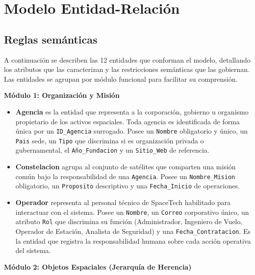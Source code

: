 \chapter{Modelo Entidad-Relación}

\section{Reglas semánticas}

A continuación se describen las 12 entidades que conforman el modelo, detallando los atributos que las caracterizan y las restricciones semánticas que las gobiernan. Las entidades se agrupan por módulo funcional para facilitar su comprensión.

\vspace{0.5cm}
\noindent \textbf{Módulo 1: Organización y Misión}

\begin{itemize}
    \item \textbf{Agencia} es la entidad que representa a la corporación, gobierno u organismo propietario de los activos espaciales. Toda agencia es identificada de forma única por un \texttt{ID\_Agencia} surrogado. Posee un \texttt{Nombre} obligatorio y único, un \texttt{Pais} sede, un \texttt{Tipo} que discrimina si es organización privada o gubernamental, el \texttt{Año\_Fundacion} y un \texttt{Sitio\_Web} de referencia.
    \item \textbf{Constelacion} agrupa al conjunto de satélites que comparten una misión común bajo la responsabilidad de una \texttt{Agencia}. Posee un \texttt{Nombre\_Mision} obligatorio, un \texttt{Proposito} descriptivo y una \texttt{Fecha\_Inicio} de operaciones.
    \item \textbf{Operador} representa al personal técnico de SpaceTech habilitado para interactuar con el sistema. Posee un \texttt{Nombre}, un \texttt{Correo} corporativo único, un atributo \texttt{Rol} que discrimina su función (Administrador, Ingeniero de Vuelo, Operador de Estación, Analista de Seguridad) y una \texttt{Fecha\_Contratacion}. Es la entidad que registra la responsabilidad humana sobre cada acción operativa del sistema.
\end{itemize}

\vspace{0.5cm}
\noindent \textbf{Módulo 2: Objetos Espaciales (Jerarquía de Herencia)}

